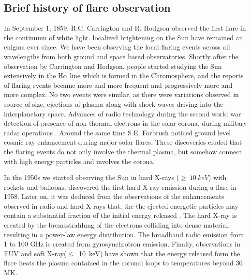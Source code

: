 \subsection{Brief history of flare observation}\label{sol_flr_1}

In September 1, 1859, R.C. Carrington and R. Hodgson  observed the first flare in the continuum of white light\citep{carrington1859,hodgson1859}.  localized brightening on the Sun have remained an enigma ever since. We have been observing the local flaring events across all wavelengths from both ground and space based observatories.  Shortly after the observation by Carrington and Hodgson, people started studying the Sun extensively in the H$\alpha$ line which is formed in the Chromosphere, and the reports of flaring events became more and more frequent and progressively more and more complex. No two events were similar, as there were variations observed in source of size, ejections of plasma along with shock waves driving into the interplanetary space. Advances of radio technology during the second world war  detection of presence of non-thermal electrons in the solar corona, during military radar operations \citep{hey46}. Around the same time S.E. Forbrush noticed ground level cosmic ray enhancement during major solar flares. These discoveries eluded that the flaring events do not only involve the thermal plasma, but somehow connect with high energy particles and involves the corona. 

In the 1950s we started observing the Sun in hard X-rays ($\ge~10~keV$) with rockets and balloons. \cite{peterson59} discovered the first hard X-ray emission during a flare in 1958. Later on, it was deduced from the observations of the enhancements observed in radio and hard X-rays that, the the ejected energetic particles may contain a substantial fraction of the initial energy released \citep{brown71}. The hard X-ray is created by the bremsstrahlung of the electrons colliding into dense material, resulting in a power-law energy distribution. The broadband radio emission from 1 to 100 GHz is created from gyrosynchrotron emission. Finally, observations in EUV and soft X-ray($\le$~10~keV) have shown that the energy released form the flare heats the plasma contained in the coronal loops to temperatures beyond 30 MK. 

